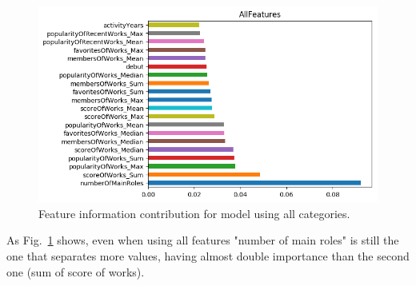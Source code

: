 \begin{figure}[!hbt]
	\centering
	\includegraphics[width=\columnwidth]{graphics/AllFeatures_DTC_featureImportances.png}
	\caption{Feature information contribution for model using all categories.}
	\label{fig:DTC_All}
\end{figure}

As Fig.~\ref{fig:DTC_All} shows, even when using all features "number of main roles" is still the one that separates more values, having almost double importance than the second one (sum of score of works).